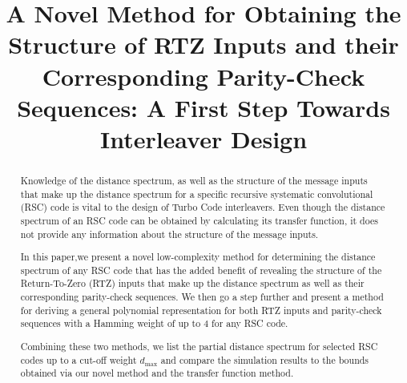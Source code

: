 \documentclass[journal,draftcls,onecolumn,12pt,twoside]{IEEEtran}
\begin{document}
\title{
A Novel Method for Obtaining the Structure of RTZ Inputs and their Corresponding Parity-Check Sequences: A First Step Towards Interleaver Design}
\author{%
}


\maketitle
\begin{abstract}
Knowledge of the distance spectrum, as well as the structure of the message inputs that make up the distance spectrum for a specific recursive systematic convolutional (RSC) code is vital to the design of Turbo Code interleavers. Even though the distance spectrum of an RSC code can be obtained by calculating its transfer function, it does not provide any information about the structure of the message inputs. %

In this paper,we present a novel low-complexity method for determining the distance spectrum of any RSC code that has the added benefit of revealing the structure of the Return-To-Zero (RTZ) inputs that make up the distance spectrum as well as their corresponding parity-check sequences. 
We then go a step further and present a method  for deriving a general polynomial representation for both RTZ inputs and parity-check sequences with a Hamming weight of up to $4$ for any RSC code.
 
 Combining these two methods, we list the partial distance spectrum for selected RSC codes up to a cut-off weight $d_{\text{max}}$ and compare the simulation results to the bounds obtained via our novel method and the transfer function method.
\end{abstract}



%



\newpage

%
\end{document}
